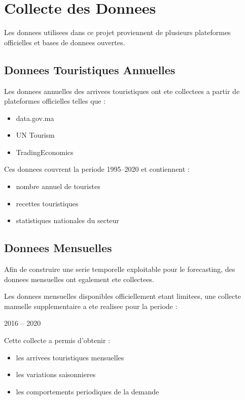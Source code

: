 \documentclass[12pt,a4paper]{report}
\begin{document}
\section{Collecte des Donnees}

Les donnees utilisees dans ce projet proviennent de plusieurs plateformes
officielles et bases de donnees ouvertes.

\subsection{Donnees Touristiques Annuelles}

Les donnees annuelles des arrivees touristiques ont ete collectees a partir
de plateformes officielles telles que :

\begin{itemize}
    \item data.gov.ma
    \item UN Tourism
    \item TradingEconomics
\end{itemize}

Ces donnees couvrent la periode 1995--2020 et contiennent :

\begin{itemize}
    \item nombre annuel de touristes
    \item recettes touristiques
    \item statistiques nationales du secteur
\end{itemize}

\subsection{Donnees Mensuelles}

Afin de construire une serie temporelle exploitable pour le forecasting,
des donnees mensuelles ont egalement ete collectees.

Les donnees mensuelles disponibles officiellement etant limitees,
une collecte manuelle supplementaire a ete realisee pour la periode :

\begin{center}
2016 -- 2020
\end{center}

Cette collecte a permis d'obtenir :

\begin{itemize}
    \item les arrivees touristiques mensuelles
    \item les variations saisonnieres
    \item les comportements periodiques de la demande
\end{itemize}
\end{document}
